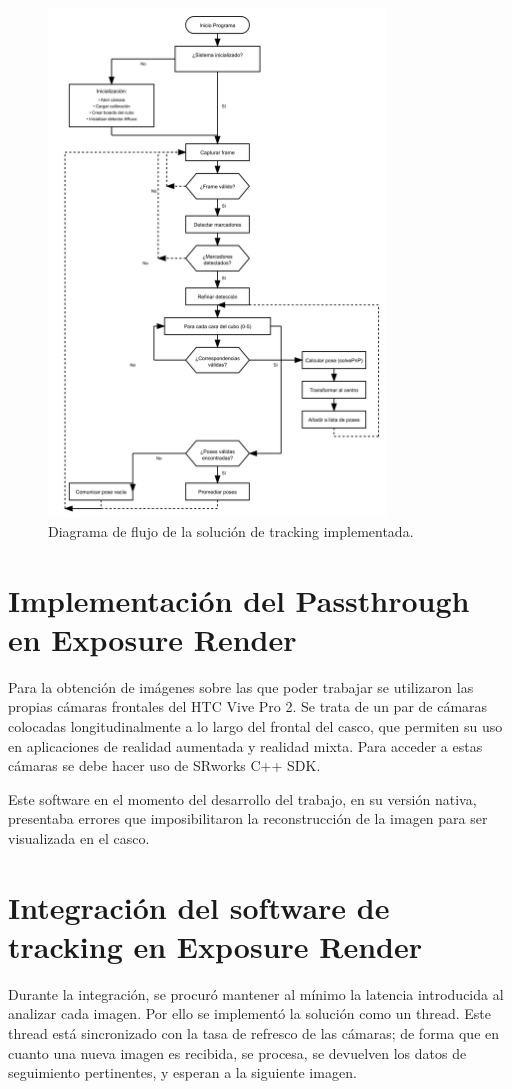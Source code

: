 \begin{figure}
	\centering
	\includegraphics[width=0.8\textwidth]{imaxes/flujo_tfg_correcto.png}
	\caption{Diagrama de flujo de la solución de tracking implementada.}
	\label{fig:flujo_tfg}
\end{figure}

\section{Implementación del Passthrough en Exposure Render}
Para la obtención de imágenes sobre las que poder trabajar se utilizaron las propias cámaras frontales del HTC Vive Pro 2. Se trata de un par de cámaras colocadas longitudinalmente a lo largo del frontal del casco, que permiten su uso en aplicaciones de realidad aumentada y realidad mixta.
Para acceder a estas cámaras se debe hacer uso de SRworks C++ SDK.

Este software en el momento del desarrollo del trabajo, en su versión nativa, presentaba errores que imposibilitaron la reconstrucción de la imagen para ser visualizada en el casco.
\section{Integración del software de tracking en Exposure Render}
Durante la integración, se procuró mantener al mínimo la latencia introducida al analizar cada imagen. Por ello se implementó la solución como un thread. Este thread está sincronizado con la tasa de refresco de las cámaras; de forma que en cuanto una nueva imagen es recibida, se procesa, se devuelven los datos de seguimiento pertinentes, y esperan a la siguiente imagen.